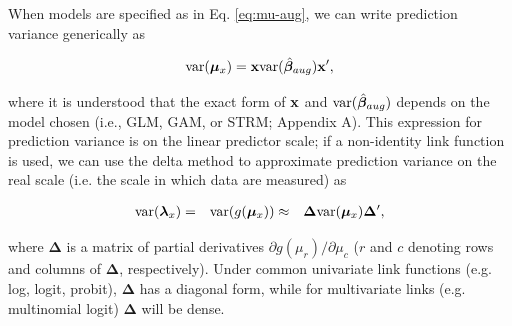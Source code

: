 \documentclass[12pt,english]{article}
\begin{document}
\begin{spacing}{1.9}
When models are specified as in Eq. \ref{eq:mu-aug}, we can write prediction variance generically as
\begin{linenomath*}
\begin{equation}
  \label{eq:var-mu}
  {\rm var}(\boldsymbol{\mu}_x)= {\bf x} {\rm var}(\hat{\boldsymbol{\beta}}_{aug}) {\bf x}^\prime,
\end{equation}
\end{linenomath*}
where it is understood that the exact form of ${\bf x}$ and ${\rm var}(\hat{\boldsymbol{\beta}}_{aug})$ depends on the model chosen (i.e., GLM, GAM, or STRM; Appendix A). This expression for prediction variance is on the linear predictor scale; if a non-identity link function is used, we can use the delta method \citep{Dorfman1938,VerHoef2012} to approximate prediction variance on the real scale (i.e. the scale in which data are measured) as
\begin{linenomath*}
\begin{eqnarray}
  \label{eq:var-lambda}
  {\rm var}(\boldsymbol{\lambda}_x) & = & {\rm var}(g(\boldsymbol{\mu}_x)) & \approx & \boldsymbol{\Delta} {\rm var}(\boldsymbol{\mu}_x)\boldsymbol{\Delta}^\prime,
\end{eqnarray}
\end{linenomath*}
where $\boldsymbol{\Delta}$ is a matrix of partial derivatives $\partial g(\mu_r)/\partial \mu_c$ ($r$ and $c$ denoting rows and columns of $\boldsymbol{\Delta}$, respectively).  Under common univariate link functions (e.g. log, logit, probit), $\boldsymbol{\Delta}$ has a diagonal form, while for multivariate links (e.g. multinomial logit) $\boldsymbol{\Delta}$ will be dense.


\end{spacing}
\end{document}

